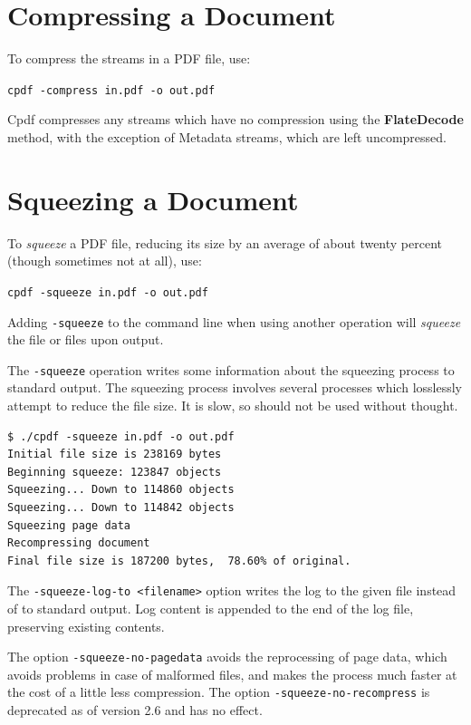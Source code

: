 \documentclass{book}
\begin{document}
\section{Compressing a Document}
  To compress the streams in a PDF file, use:

  \begin{framed}
    \noindent\small\verb!cpdf -compress in.pdf -o out.pdf!
  \end{framed}

  \noindent Cpdf compresses any streams which have no compression using the
  \textbf{Flate\-Decode} method, with the exception of Metadata streams, which
  are left uncompressed.
  
  \section{Squeezing a Document}
  To \textit{squeeze} a PDF file, reducing its size by an average of about twenty percent (though sometimes not at all), use:

  \begin{framed}
    \noindent\small\verb!cpdf -squeeze in.pdf -o out.pdf!
  \end{framed}

  \noindent Adding \texttt{-squeeze} to the command line when using another operation will \textit{squeeze} the file or files upon output.
  
  The \texttt{-squeeze} operation writes some information about the squeezing process to standard output. The squeezing process involves several processes which losslessly attempt to reduce the file size. It is slow, so should not be used without thought.

\begin{verbatim}
$ ./cpdf -squeeze in.pdf -o out.pdf
Initial file size is 238169 bytes
Beginning squeeze: 123847 objects
Squeezing... Down to 114860 objects
Squeezing... Down to 114842 objects
Squeezing page data
Recompressing document
Final file size is 187200 bytes,  78.60% of original.
\end{verbatim}

\noindent The \texttt{-squeeze-log-to <filename>} option writes the log to the given file instead of to standard output. Log content is appended to the end of the log file, preserving existing contents.

The option \texttt{-squeeze-no-pagedata} avoids the reprocessing of page data, which avoids problems in case of malformed files, and makes the process much faster at the cost of a little less compression. The option \texttt{-squeeze-no-recompress} is deprecated as of version 2.6 and has no effect.
\end{document}
